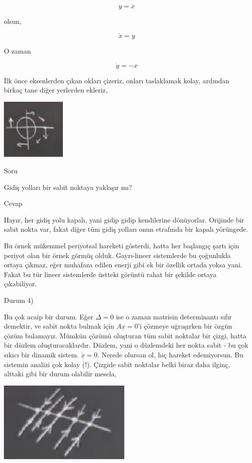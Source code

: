 \documentclass[12pt,fleqn]{article}\usepackage{../../common}
\begin{document}
$$ y = \dot{x} $$

olsun, 

$$ \dot{x} = y $$

O zaman 

$$ \dot{y} = -x $$

İlk önce eksenlerden çıkan okları çizeriz, onları taslaklamak kolay, ardından
birkaç tane diğer yerlerden ekleriz,

\includegraphics[height=3cm]{05_18.png}

Soru

Gidiş yolları bir sabit noktaya yaklaşır mı?

Cevap

Hayır, her gidiş yolu kapalı, yani gidip gidip kendilerine dönüyorlar. Orijinde
bir sabit nokta var, fakat diğer tüm gidiş yolları onun etrafında bir kapalı
yörüngede. 

Bu örnek mükemmel periyotsal hareketi gösterdi, hatta her başlangıç şartı için
periyot olan bir örnek görmüş olduk. Gayrı-lineer sistemlerde bu çoğunlukla
ortaya çıkmaz, eğer muhafaza edilen enerji gibi ek bir özellik ortada yoksa
yani. Fakat bu tür lineer sistemlerde üstteki görüntü rahat bir şekilde ortaya
çıkabiliyor. 

Durum 4)

Bu çok acaip bir durum. Eğer $\Delta = 0$ ise o zaman matrisin determinantı
sıfır demektir, ve sabit nokta bulmak için $A \underline{x} = 0$'i çözmeye
uğraşırken bir özgün çözüm bulamayız. Mümkün çözümü oluşturan tüm sabit noktalar
bir çizgi, hatta bir düzlem oluşturacaklardır. Düzlem, yani o düzlemdeki her
nokta sabit - bu çok sıkıcı bir dinamik sistem. $\dot{\underline{x}}=0$. Nerede
olursan ol, hiç hareket edemiyorsun. Bu sistemin analizi çok kolay (!). Çizgide
sabit noktalar belki biraz daha ilginç, alttaki gibi bir durum olabilir mesela,

\includegraphics[height=4cm]{05_19.png}
\end{document}
